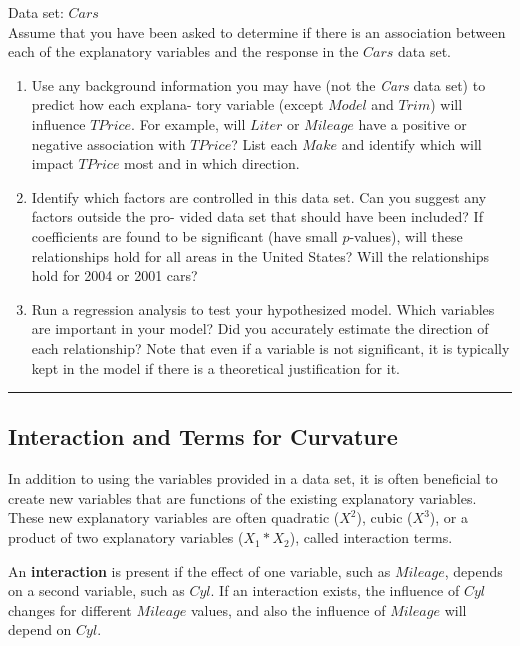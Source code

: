 \documentclass[
]{report}
\begin{document}
Data set: \(Cars\)\\
Assume that you have been asked to determine if there is an association between each of the explanatory
variables and the response in the \(Cars\) data set.

\begin{enumerate}
\def\labelenumi{\arabic{enumi}.}
\setcounter{enumi}{31}
\item
  Use any background information you may have (not the \emph{Cars} data set) to predict how each explana-
  tory variable (except \(Model\) and \(Trim\)) will influence \(TPrice\). For example, will \(Liter\) or \(Mileage\)
  have a positive or negative association with \(TPrice\)? List each \(Make\) and identify which will impact
  \(TPrice\) most and in which direction.
\item
  Identify which factors are controlled in this data set. Can you suggest any factors outside the pro-
  vided data set that should have been included? If coefficients are found to be significant (have small
  \(p\)-values), will these relationships hold for all areas in the United States? Will the relationships hold for 2004 or 2001 cars?
\item
  Run a regression analysis to test your hypothesized model. Which variables are important in your model? Did you accurately estimate the direction of each relationship? Note that even if a variable is not significant, it is typically kept in the model if there is a theoretical justification
  for it.
\end{enumerate}

\begin{center}\rule{0.5\linewidth}{0.5pt}\end{center}

\subsection{Interaction and Terms for Curvature}\label{interaction-and-terms-for-curvature}

In addition to using the variables provided in a data set, it is often beneficial to create new variables that are functions of the existing explanatory variables. These new explanatory variables are often quadratic (\(X^2\)), cubic (\(X^3\)), or a product of two explanatory variables (\(X_1*X_2\)), called interaction terms.

An \textbf{interaction} is present if the effect of one variable, such as \(Mileage\), depends on a second variable, such as \(Cyl\). If an interaction exists, the influence of \(Cyl\) changes for different \(Mileage\) values, and also the influence of \(Mileage\) will depend on \(Cyl\).
\end{document}
